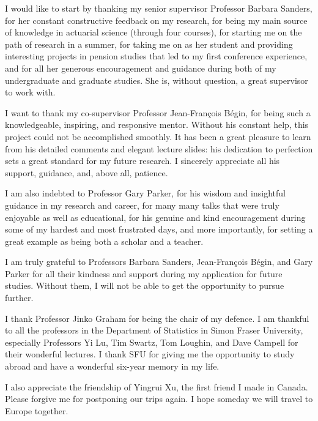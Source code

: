 \documentclass{sfuthesis}
\numberwithin{equation}{chapter}
\begin{document}
	
	\begin{acknowledgements}

		\justify
		I would like to start by thanking my senior supervisor Professor Barbara Sanders, for her constant constructive feedback on my research, for being my main source of knowledge in actuarial science (through four courses), for starting me on the path of research in a summer, for taking me on as her student and providing interesting projects in pension studies that led to my first conference experience, and for all her generous encouragement and guidance during both of my undergraduate and graduate studies. She is, without question, a great supervisor to work with.

		

		\justify
		I want to thank my co-supervisor Professor Jean-François Bégin, for being such a knowledgeable, inspiring, and responsive mentor. Without his constant help, this project could not be accomplished smoothly. It has been a great pleasure to learn from his detailed comments and elegant lecture slides: his dedication to perfection sets a great standard for my future research. I sincerely appreciate all his support, guidance,  and, above all, patience.

		

		\justify
		I am also indebted to Professor Gary Parker, for his wisdom and insightful guidance in my research and career, for many many talks that were truly enjoyable as well as educational, for his genuine and kind encouragement during some of my hardest and most frustrated days, and more importantly, for setting a great example as being both a scholar and a teacher. 

		

		\justify
		I am truly grateful to Professors Barbara Sanders, Jean-François Bégin, and Gary Parker for all their kindness and support during my application for future studies. Without them, I will not be able to get the opportunity to pursue further.

		

		\justify
		I thank Professor Jinko Graham for being the chair of my defence. I am thankful to all the professors in the Department of Statistics in Simon Fraser University, especially Professors Yi Lu, Tim Swartz, Tom Loughin, and Dave Campell for their wonderful lectures. I thank SFU for giving me the opportunity to study abroad and have a wonderful six-year memory in my life.

		

		\justify
		I also appreciate the friendship of Yingrui Xu, the first friend I made in Canada. Please forgive me for postponing our trips again. I hope someday we will travel to Europe together.


\end{acknowledgements}
\end{document}
